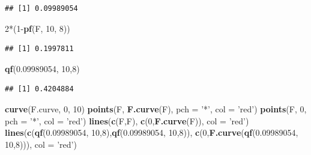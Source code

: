\documentclass[]{book}
\newenvironment{Shaded}{\begin{snugshade}}{\end{snugshade}}
\newcommand{\KeywordTok}[1]{\textcolor[rgb]{0.13,0.29,0.53}{\textbf{{#1}}}}
\newcommand{\DataTypeTok}[1]{\textcolor[rgb]{0.13,0.29,0.53}{{#1}}}
\newcommand{\DecValTok}[1]{\textcolor[rgb]{0.00,0.00,0.81}{{#1}}}
\newcommand{\FloatTok}[1]{\textcolor[rgb]{0.00,0.00,0.81}{{#1}}}
\newcommand{\StringTok}[1]{\textcolor[rgb]{0.31,0.60,0.02}{{#1}}}
\newcommand{\NormalTok}[1]{{#1}}
\begin{document}
\begin{verbatim}
## [1] 0.09989054
\end{verbatim}

\begin{Shaded}
\begin{Highlighting}[]
\DecValTok{2}\NormalTok{*(}\DecValTok{1}\NormalTok{-}\KeywordTok{pf}\NormalTok{(F, }\DecValTok{10}\NormalTok{, }\DecValTok{8}\NormalTok{))}
\end{Highlighting}
\end{Shaded}

\begin{verbatim}
## [1] 0.1997811
\end{verbatim}

\begin{Shaded}
\begin{Highlighting}[]
\KeywordTok{qf}\NormalTok{(}\FloatTok{0.09989054}\NormalTok{, }\DecValTok{10}\NormalTok{,}\DecValTok{8}\NormalTok{)}
\end{Highlighting}
\end{Shaded}

\begin{verbatim}
## [1] 0.4204884
\end{verbatim}

\begin{Shaded}
\begin{Highlighting}[]
\KeywordTok{curve}\NormalTok{(F.curve, }\DecValTok{0}\NormalTok{, }\DecValTok{10}\NormalTok{)}
\KeywordTok{points}\NormalTok{(F, }\KeywordTok{F.curve}\NormalTok{(F), }\DataTypeTok{pch =} \StringTok{'*'}\NormalTok{, }\DataTypeTok{col =} \StringTok{'red'}\NormalTok{)}
\KeywordTok{points}\NormalTok{(F, }\DecValTok{0}\NormalTok{, }\DataTypeTok{pch =} \StringTok{'*'}\NormalTok{, }\DataTypeTok{col =} \StringTok{'red'}\NormalTok{)}
\KeywordTok{lines}\NormalTok{(}\KeywordTok{c}\NormalTok{(F,F), }\KeywordTok{c}\NormalTok{(}\DecValTok{0}\NormalTok{,}\KeywordTok{F.curve}\NormalTok{(F)), }\DataTypeTok{col =} \StringTok{'red'}\NormalTok{)}
\KeywordTok{lines}\NormalTok{(}\KeywordTok{c}\NormalTok{(}\KeywordTok{qf}\NormalTok{(}\FloatTok{0.09989054}\NormalTok{, }\DecValTok{10}\NormalTok{,}\DecValTok{8}\NormalTok{),}\KeywordTok{qf}\NormalTok{(}\FloatTok{0.09989054}\NormalTok{, }\DecValTok{10}\NormalTok{,}\DecValTok{8}\NormalTok{)), }\KeywordTok{c}\NormalTok{(}\DecValTok{0}\NormalTok{,}\KeywordTok{F.curve}\NormalTok{(}\KeywordTok{qf}\NormalTok{(}\FloatTok{0.09989054}\NormalTok{, }\DecValTok{10}\NormalTok{,}\DecValTok{8}\NormalTok{))), }\DataTypeTok{col =} \StringTok{'red'}\NormalTok{)}
\end{Highlighting}
\end{Shaded}
\end{document}
